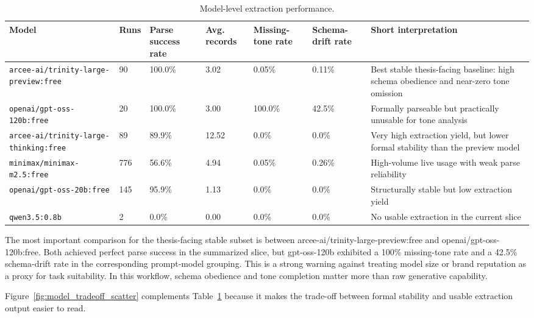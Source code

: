 \begin{table}[htbp]
\centering
\caption{Model-level extraction performance.}
\label{tab:model-level-extraction-performance}
\footnotesize
\setlength{\tabcolsep}{4pt}
\renewcommand{\arraystretch}{1.15}
\begin{tabularx}{\linewidth}{|X|p{1.8cm}|X|p{1.8cm}|p{1.8cm}|p{1.8cm}|X|}
\hline
\textbf{Model} & \textbf{Runs} & \textbf{Parse success rate} & \textbf{Avg. records} & \textbf{Missing-tone rate} & \textbf{Schema-drift rate} & \textbf{Short interpretation} \\ \hline
\texttt{arcee-ai/trinity-large-preview:free} & 90 & 100.0\% & 3.02 & 0.05\% & 0.11\%  & Best stable thesis-facing baseline: high schema obedience and near-zero tone omission \\ \hline
\texttt{openai/gpt-oss-120b:free} & 20 & 100.0\% & 3.00 & 100.0\% & 42.5\%  & Formally parseable but practically unusable for tone analysis \\ \hline
\texttt{arcee-ai/trinity-large-thinking:free} & 89 & 89.9\% & 12.52 & 0.0\% & 0.0\%  & Very high extraction yield, but lower formal stability than the preview model \\ \hline
\texttt{minimax/minimax-m2.5:free} & 776 & 56.6\% & 4.94 & 0.05\% & 0.26\%  & High-volume live usage with weak parse reliability \\ \hline
\texttt{openai/gpt-oss-20b:free} & 145 & 95.9\% & 1.13 & 0.0\% & 0.0\%  & Structurally stable but low extraction yield \\ \hline
\texttt{qwen3.5:0.8b} & 2 & 0.0\% & 0.00 & 0.0\% & 0.0\%  & No usable extraction in the current slice \\ \hline
\end{tabularx}
\end{table}

The most important comparison for the thesis-facing stable subset is between arcee-ai/trinity-large-preview:free and openai/gpt-oss-120b:free. Both achieved perfect parse success in the summarized slice, but gpt-oss-120b exhibited a 100\% missing-tone rate and a 42.5\% schema-drift rate in the corresponding prompt-model grouping. This is a strong warning against treating model size or brand reputation as a proxy for task suitability. In this workflow, schema obedience and tone completion matter more than raw generative capability.

Figure~\ref{fig:model_tradeoff_scatter} complements Table~\ref{tab:model-level-extraction-performance} because it makes the trade-off between formal stability and usable extraction output easier to read.

